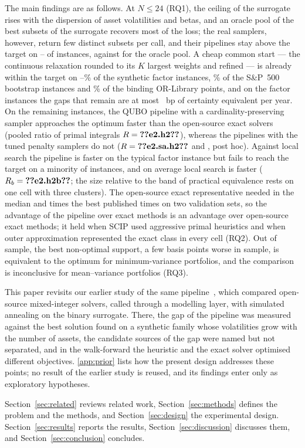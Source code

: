 The main findings are as follows. At $N \le 24$ (RQ1), the ceiling of the surrogate rises with the dispersion of asset
volatilities and betas, and an oracle pool of the best subsets of the surrogate recovers most of the loss; the real
samplers, however, return few distinct subsets per call, and their pipelines stay above the target on
-- of  instances, against
 for the oracle pool. A cheap common start --- the continuous relaxation rounded to its
$K$ largest weights and refined --- is already within the target on
--\% of the synthetic factor instances, \% of the
S\&P~500 bootstrap instances and \% of the binding OR-Library points, and on the factor instances the
gaps that remain are at most ~bp of certainty equivalent per year. On the remaining
instances, the QUBO pipeline with a cardinality-preserving sampler approaches the optimum faster than the open-source
exact solvers (pooled ratio of primal integrals $R = \res{e2.h2}$), whereas the pipelines with the tuned penalty
samplers do not ($R = \res{e2.sa.h2}$ and , post hoc). Against local search the pipeline is faster on
the typical factor instance but fails to reach the target on a minority of instances, and on average local search is
faster ($R_b = \res{e2.h2b}$; the size relative to the band of practical equivalence rests on one cell with three
clusters). The open-source exact representative needed in the median  and
 times the best published times on two validation sets, so the advantage of the pipeline over
exact methods is an advantage over open-source exact methods; it held when SCIP used aggressive primal heuristics and
when outer approximation represented the exact class in every cell (RQ2). Out of sample, the best non-optimal support, a few
basis points worse in sample, is equivalent to the optimum for minimum-variance portfolios, and the comparison is
inconclusive for mean--variance portfolios (RQ3).

This paper revisits our earlier study of the same pipeline~\cite{avdoshin2026discrete},
which compared open-source mixed-integer solvers, called through a modelling layer, with simulated annealing on the
binary surrogate. There, the gap of the pipeline was measured against the best solution found on a synthetic family
whose volatilities grow with the number of assets, the candidate sources of the gap were named but not separated, and
in the walk-forward the heuristic and the exact solver optimised different objectives. \ref{app:prior} lists how the
present design addresses these points; no result of the earlier study is reused, and its findings enter only as
exploratory hypotheses.

Section~\ref{sec:related} reviews related work, Section~\ref{sec:methods} defines the problem and the methods, and
Section~\ref{sec:design} the experimental design. Section~\ref{sec:results} reports the results,
Section~\ref{sec:discussion} discusses them, and Section~\ref{sec:conclusion} concludes.
